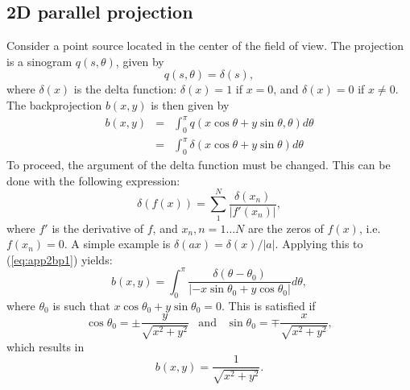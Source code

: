 \subsection{2D parallel projection}
Consider a point source located in the center of the field of view.
The projection is a sinogram $q(s, \theta)$, given by
\begin{equation}
  q(s, \theta) = \delta(s),
\end{equation}
where $\delta(x)$ is the delta function: $\delta(x) = 1$ if $x = 0$, and
$\delta(x) = 0$ if $x \neq 0$.
The backprojection $b(x,y)$ is then given by
\begin{eqnarray}
  b(x,y) & = & \int_0^\pi q(x \cos\theta + y\sin\theta, \theta)
                d\theta \nonumber\\
         & = & \int_0^\pi \delta(x\cos\theta + y\sin\theta) d\theta
                \label{eq:app2bp1}
\end{eqnarray}
To proceed, the argument of the delta function must be changed. This
can be done with the following expression:
\begin{equation}
  \delta(f(x)) = \sum_1^N \frac{\delta(x_n)}{|f'(x_n)|},
\end{equation}
where $f'$ is the derivative of $f$, and $x_n, n=1 \ldots N$ are the
zeros of $f(x)$, i.e. $f(x_n) = 0$. A simple example is $\delta(ax) =
\delta(x) / |a|$. Applying this to (\ref{eq:app2bp1}) yields:
\begin{equation}
 b(x,y)  =  \int_0^\pi \frac{\delta(\theta - \theta_0)}
                              {|-x\sin\theta_0 + y\cos\theta_0|} d\theta,
\end{equation}
where $\theta_0$ is such that $x\cos\theta_0 + y\sin\theta_0 =
0$. This is satisfied if
\begin{displaymath}
  \cos\theta_0 = \pm \frac{y}{\sqrt{x^2+y^2}} 
       \;\;\;\mbox{and}\;\;\;
  \sin\theta_0 = \mp \frac{x}{\sqrt{x^2+y^2}},
\end{displaymath}
which results in
\begin{equation}
  b(x,y) = \frac{1}{\sqrt{x^2 + y^2}}.
\end{equation}

